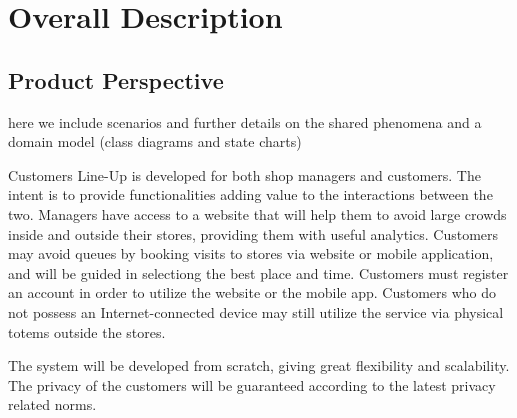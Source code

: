 \section{Overall Description}\label{sec:overall_desc}

\subsection{Product Perspective}

here we include scenarios and further details on the shared
phenomena and a domain model (class diagrams and state charts)

Customers Line-Up is developed for both shop managers and customers.
The intent is to provide functionalities adding value to the interactions between the two.
Managers have access to a website that will help them to avoid large crowds inside and outside their stores, providing them with useful analytics.
Customers may avoid queues by booking visits to stores via website or mobile application, and will be guided in selectiong the best place and time.
Customers must register an account in order to utilize the website or the mobile app.
Customers who do not possess an Internet-connected device may still utilize the service via physical totems outside the stores.

The system will be developed from scratch, giving great flexibility and scalability.
The privacy of the customers will be guaranteed according to the latest privacy related norms.


